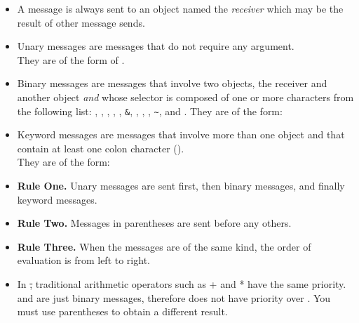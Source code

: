 \documentclass[a4paper,10pt,twoside]{book}
\begin{document}
\begin{itemize}
\item A message is always sent to an object named the \emph{receiver} which may be the result of other message sends.

\item Unary messages are messages that do not require any argument.\\
They are of the form of .

\item Binary messages are messages that involve two objects, the receiver and another object \emph{and} whose selector is composed of  one or more characters from the following list: \ct{+}, \ct{-}, \ct{*}, \ct{/}, \ct{|}, \texttt{\&}, \ct{=}, \ct{>}, \ct{<}, \texttt{\~}, and .
They are of the form: 
\item Keyword messages are messages that involve more than one object and that contain at least one colon character (\ct{:}). \\
They are of the form:

\item \textbf{Rule One.} Unary messages are sent first, then binary messages, and finally keyword messages.
\item \textbf{Rule Two.} Messages in parentheses are sent before any others.
\item \textbf{Rule Three.} When the messages are of the same kind, the order of evaluation is from left to right.
\item In \st, traditional arithmetic operators such as + and * have the same priority. \ct{+} and \ct{*} are just binary messages, therefore \ct{*} does not have priority over \ct{+}. You must use parentheses to obtain a different result.
\end{itemize}

\ifx\wholebook\relax\else
\end{document}
